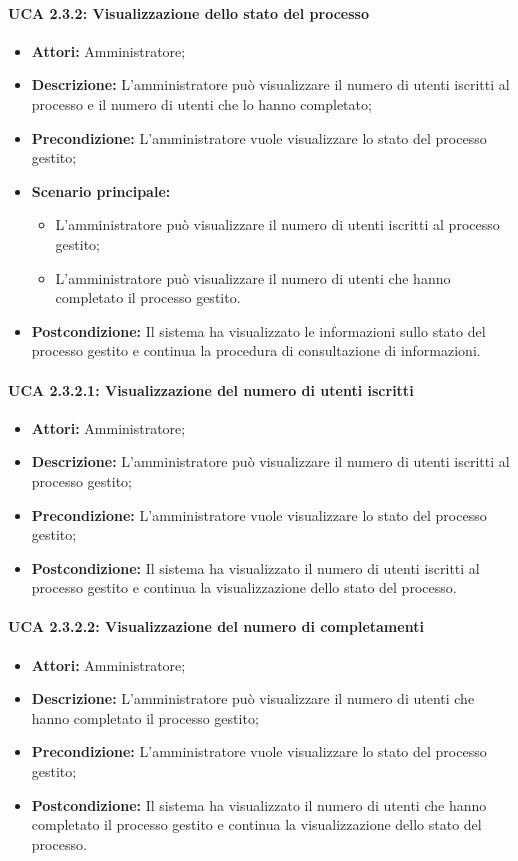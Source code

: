 \paragraph{UCA 2.3.2: Visualizzazione dello stato del processo}
\begin{itemize}
\item \textbf{Attori:}
 Amministratore;
\item \textbf{Descrizione:} 
L'amministratore può visualizzare il numero di utenti iscritti al processo e il numero di utenti che lo hanno completato; 
\item \textbf{Precondizione:} 
L'amministratore vuole visualizzare lo stato del processo gestito;
\item \textbf{Scenario principale:} 
\begin{itemize}
\item L'amministratore può visualizzare il numero di utenti iscritti al processo gestito;
\item L'amministratore può visualizzare il numero di utenti che hanno completato il processo gestito.
\end{itemize}
\item \textbf{Postcondizione:} 
Il sistema ha visualizzato le informazioni sullo stato del processo gestito e continua la procedura di consultazione di informazioni.
\end{itemize}

\paragraph{UCA 2.3.2.1: Visualizzazione del numero di utenti iscritti}
\begin{itemize}
\item \textbf{Attori:}
 Amministratore;
\item \textbf{Descrizione:} 
L'amministratore può visualizzare il numero di utenti iscritti al processo gestito; 
\item \textbf{Precondizione:} 
L'amministratore vuole visualizzare lo stato del processo gestito;
\item \textbf{Postcondizione:} 
Il sistema ha visualizzato il numero di utenti iscritti al processo gestito e continua la visualizzazione dello stato del processo.
\end{itemize}

\paragraph{UCA 2.3.2.2: Visualizzazione del numero di completamenti}
\begin{itemize}
\item \textbf{Attori:}
 Amministratore;
\item \textbf{Descrizione:} 
L'amministratore può visualizzare il numero di utenti che hanno completato il processo gestito; 
\item \textbf{Precondizione:} 
L'amministratore vuole visualizzare lo stato del processo gestito;
\item \textbf{Postcondizione:} 
Il sistema ha visualizzato il numero di utenti che hanno completato il processo gestito e continua la visualizzazione dello stato del processo.
\end{itemize}

